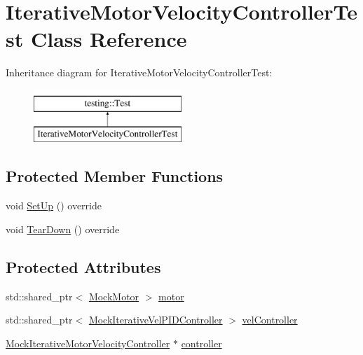 \hypertarget{classIterativeMotorVelocityControllerTest}{}\section{Iterative\+Motor\+Velocity\+Controller\+Test Class Reference}
\label{classIterativeMotorVelocityControllerTest}
Inheritance diagram for Iterative\+Motor\+Velocity\+Controller\+Test\+:\begin{figure}[H]
\begin{center}
\leavevmode
\includegraphics[height=2.000000cm]{classIterativeMotorVelocityControllerTest}
\end{center}
\end{figure}
\subsection*{Protected Member Functions}
\begin{DoxyCompactItemize}
\item 
void \mbox{\hyperlink{classIterativeMotorVelocityControllerTest_a5981fde46863e15e36142bfa0593da5e}{Set\+Up}} () override
\item 
void \mbox{\hyperlink{classIterativeMotorVelocityControllerTest_a180a0d97606df6bbd26b486afc95003a}{Tear\+Down}} () override
\end{DoxyCompactItemize}
\subsection*{Protected Attributes}
\begin{DoxyCompactItemize}
\item 
std\+::shared\+\_\+ptr$<$ \mbox{\hyperlink{classokapi_1_1MockMotor}{Mock\+Motor}} $>$ \mbox{\hyperlink{classIterativeMotorVelocityControllerTest_a3d25c32b94255545afe330ff0720354a}{motor}}
\item 
std\+::shared\+\_\+ptr$<$ \mbox{\hyperlink{classMockIterativeVelPIDController}{Mock\+Iterative\+Vel\+P\+I\+D\+Controller}} $>$ \mbox{\hyperlink{classIterativeMotorVelocityControllerTest_a924008a7dc645ea4a9daf24ac742b267}{vel\+Controller}}
\item 
\mbox{\hyperlink{classMockIterativeMotorVelocityController}{Mock\+Iterative\+Motor\+Velocity\+Controller}} $\ast$ \mbox{\hyperlink{classIterativeMotorVelocityControllerTest_a6ad00489deb5816acc7e25c565d5a04a}{controller}}
\end{DoxyCompactItemize}
